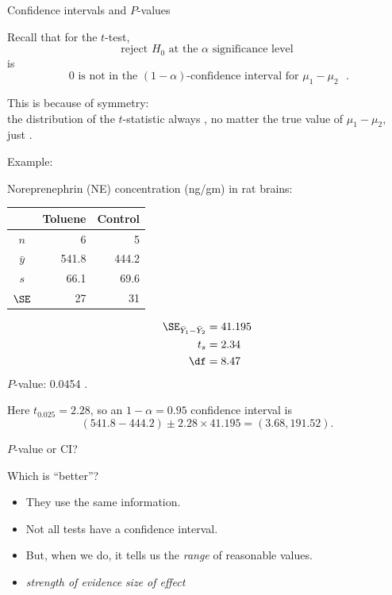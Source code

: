 \begin{frame}{Confidence intervals and $P$-values}

    Recall that
  for the $t$-test,
  \[  \text{reject $H_0$ at the $\alpha$ significance level} \]
  is 
  \[  \text{ 0 is not in the $(1-\alpha)$-confidence interval for $\mu_1-\mu_2$ }. \]

  \vspace{2em}

  This is because of \alert{symmetry}: \\
  the distribution of the $t$-statistic always ,
  no matter the true value of $\mu_1 - \mu_2$,
  just .

\end{frame}

\begin{frame}{Example: }

    Noreprenephrin (NE) concentration (ng/gm) in rat brains:
    \begin{center}
      \begin{tabular}{c|rr}
            & Toluene & Control \\
          \hline
          $n$ & 6 & 5 \\
          $\bar y$ & 541.8 & 444.2 \\
          $s$  & 66.1 & 69.6 \\
          $\SE$ & 27 & 31 \\
     \end{tabular}
   \end{center}


     \begin{align*}
         \SE_{\bar Y_1 - \bar Y_2} &= 41.195 \\
         t_s &= 2.34  \\
         \df &= 8.47 
     \end{align*}
     $P$-value: 0.0454 .


  \vspace{2em}

  Here $t_{0.025} = 2.28$, so an $1-\alpha=0.95$ confidence interval is
  \[  (541.8-444.2) \pm 2.28 \times 41.195 = (3.68,191.52) . \]

\end{frame}

\begin{frame}{$P$-value or CI?}

  Which is ``better''?

  \pause
  \begin{itemize}
      \item They use the same information.
      \item Not all tests have a confidence interval.
      \item But, when we do, it tells us the \emph{range} of reasonable values.
      \item \emph{strength of evidence}  \emph{size of effect}
  \end{itemize}

\end{frame}



